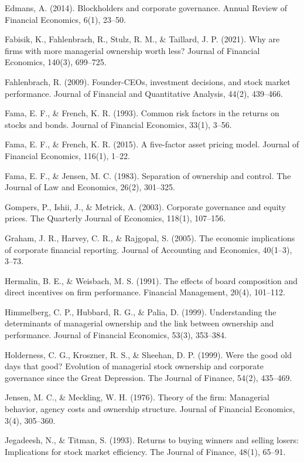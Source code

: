 Edmans, A. (2014). Blockholders and corporate governance. Annual Review of Financial Economics, 6(1), 23--50.

Fabisik, K., Fahlenbrach, R., Stulz, R. M., \& Taillard, J. P. (2021). Why are firms with more managerial ownership worth less? Journal of Financial Economics, 140(3), 699--725.

Fahlenbrach, R. (2009). Founder-CEOs, investment decisions, and stock market performance. Journal of Financial and Quantitative Analysis, 44(2), 439--466.

Fama, E. F., \& French, K. R. (1993). Common risk factors in the returns on stocks and bonds. Journal of Financial Economics, 33(1), 3--56.

Fama, E. F., \& French, K. R. (2015). A five-factor asset pricing model. Journal of Financial Economics, 116(1), 1--22.

Fama, E. F., \& Jensen, M. C. (1983). Separation of ownership and control. The Journal of Law and Economics, 26(2), 301--325.

Gompers, P., Ishii, J., \& Metrick, A. (2003). Corporate governance and equity prices. The Quarterly Journal of Economics, 118(1), 107--156.

Graham, J. R., Harvey, C. R., \& Rajgopal, S. (2005). The economic implications of corporate financial reporting. Journal of Accounting and Economics, 40(1--3), 3--73.

Hermalin, B. E., \& Weisbach, M. S. (1991). The effects of board composition and direct incentives on firm performance. Financial Management, 20(4), 101--112.

Himmelberg, C. P., Hubbard, R. G., \& Palia, D. (1999). Understanding the determinants of managerial ownership and the link between ownership and performance. Journal of Financial Economics, 53(3), 353--384.

Holderness, C. G., Kroszner, R. S., \& Sheehan, D. P. (1999). Were the good old days that good? Evolution of managerial stock ownership and corporate governance since the Great Depression. The Journal of Finance, 54(2), 435--469.

Jensen, M. C., \& Meckling, W. H. (1976). Theory of the firm: Managerial behavior, agency costs and ownership structure. Journal of Financial Economics, 3(4), 305--360.

Jegadeesh, N., \& Titman, S. (1993). Returns to buying winners and selling losers: Implications for stock market efficiency. The Journal of Finance, 48(1), 65--91.

